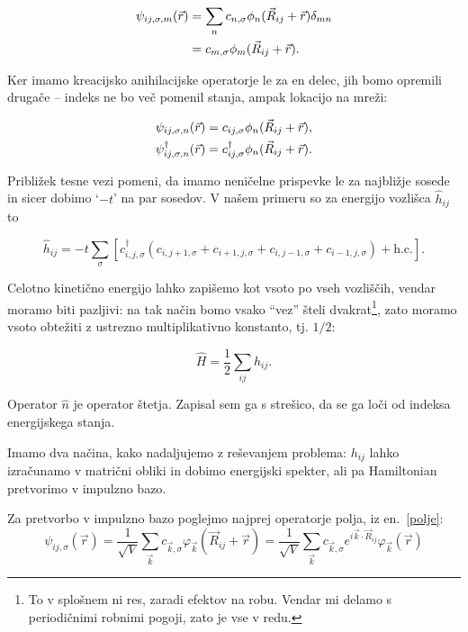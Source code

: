 \documentclass[a4paper, 12pt]{article}
\newcommand{\hn}{
	\ensuremath{\hat{n}}
}
\newcommand{\oh}{
	\ensuremath{\hat{h}}
}
\renewcommand{\ni}{
	\noindent
}
\begin{document}
\begin{align}
	\psi_{ij,\sigma,m}(\vec{r}) &= \sum_n c_{n,\sigma} \phi_n (\vec{R}_{ij} + \vec{r})
		\delta_{mn} \notag \\
	&= c_{m,\sigma} \phi_m (\vec{R}_{ij} + \vec{r}).
\end{align}

\ni Ker imamo kreacijsko anihilacijske operatorje le za en delec, jih bomo opremili druga\v ce -- indeks
ne bo ve\v c pomenil stanja, ampak lokacijo na mre\v zi:

\begin{align}
	\psi_{ij,\sigma,n} (\vec{r}) &= c_{ij,\sigma} \phi_n (\vec{R}_{ij} + \vec{r}), \notag \\
	\psi^\dagger_{ij,\sigma,n} (\vec{r}) &= c^\dagger_{ij,\sigma} \phi_n (\vec{R}_{ij} + \vec{r}).
	\label{polje2}
\end{align}

Pribli\v zek tesne vezi pomeni, da imamo neni\v celne prispevke le za najbli\v zje sosede in sicer
dobimo `$-t$' na par sosedov. V na\v sem primeru so za energijo vozli\v sca $\oh_{ij}$ to

\begin{equation}
	\oh_{ij} = -t \sum_{\sigma} [c^\dagger_{i,j,\sigma} (c_{i,j+1,\sigma} + c_{i+1,j,\sigma} +
		c_{i,j-1,\sigma} + c_{i-1,j,\sigma}) + \text{h.c.}].
	\label{oh}
\end{equation}

\ni Celotno kineti\v cno energijo lahko zapi\v semo kot vsoto po vseh vozli\v s\v cih, vendar moramo
biti pazljivi: na tak na\v cin bomo vsako "`vez"' \v steli dvakrat\footnote{To v splo\v snem ni res,
zaradi efektov na robu. Vendar mi delamo s periodi\v cnimi robnimi pogoji, zato je vse v redu.}, zato
moramo vsoto obte\v ziti z ustrezno multiplikativno konstanto, tj. $1/2$:

\begin{equation}
	\hat{H} = \frac{1}{2}\sum_{ij} \oh_{ij}.
\end{equation}

\ni Operator $\hn$ je operator \v stetja. Zapisal sem ga s stre\v sico, da se ga lo\v ci od indeksa
energijskega stanja.

Imamo dva na\v cina, kako nadaljujemo z re\v sevanjem problema: $h_{ij}$ lahko izra\v cunamo v
matri\v cni obliki in dobimo energijski spekter, ali pa Hamiltonian pretvorimo v impulzno bazo.

Za pretvorbo v impulzno bazo poglejmo najprej operatorje polja, iz en.~\eqref{polje}:
\begin{equation}
	\psi_{ij,\sigma} (\vec{r}) = \frac{1}{\sqrt{V}}\sum_{\vec{k}}
		c_{\vec{k},\sigma}\varphi_{\vec{k}}(\vec{R}_{ij} + \vec{r}) = 
		\frac{1}{\sqrt{V}}\sum_{\vec{k}} c_{\vec{k},\sigma} e^{i\vec{k}\cdot\vec{R}_{ij}}
		\varphi_{\vec{k}}(\vec{r})
\end{equation}
\end{document}
